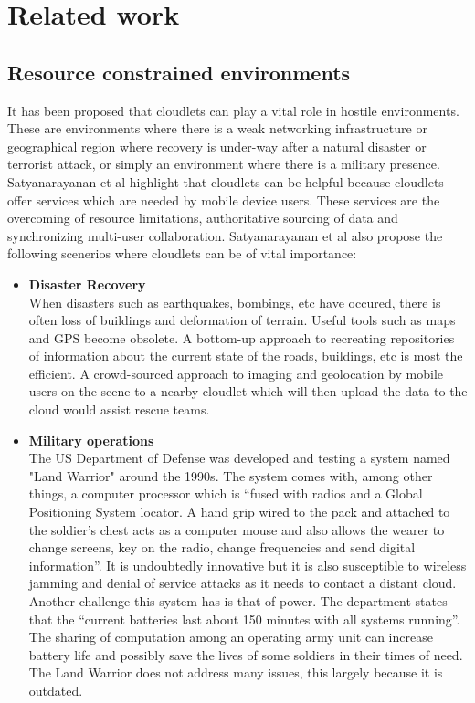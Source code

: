 \section{Related work}

\subsection{Resource constrained environments}
It has been proposed that cloudlets can play a vital role in hostile environments\cite{RefWorks:107}. These are environments
where there is a weak networking infrastructure or geographical region where recovery is under-way after a natural disaster or terrorist attack, or simply an environment where there is a military presence. Satyanarayanan et al\cite{RefWorks:107} highlight that cloudlets can be helpful because cloudlets offer services which are needed by mobile device users. These
services are the overcoming of resource limitations, authoritative sourcing of data and synchronizing multi-user collaboration. Satyanarayanan et al\cite{RefWorks:107} also propose the following scenerios where cloudlets can be of vital importance:

\begin{itemize}

\item \textbf{Disaster Recovery} \\ When disasters such as earthquakes, bombings, etc have occured, there is often loss of buildings and deformation of terrain. Useful tools such as maps and GPS become obsolete. A bottom-up approach to recreating repositories of information about the current state of the roads, buildings, etc is most the efficient. A crowd-sourced approach to imaging and geolocation by mobile users on the scene to a nearby cloudlet which will then upload the data to the cloud would assist rescue teams.

\item \textbf{Military operations} \\ The US Department of Defense was developed and testing a system named "Land Warrior" around the 1990s\cite{usdefense}. The system comes with, among other things, a computer processor which is ``fused with radios and a Global Positioning System locator. A hand grip wired to the pack and attached to the soldier's chest acts as a computer mouse and also allows the wearer to change screens, key on the radio, change frequencies and send digital information''. It is undoubtedly innovative but it is also susceptible to
wireless jamming and denial of service attacks as it needs to contact a distant cloud. Another challenge this system has is that of power. The department states that the ``current batteries last about 150 minutes with all systems running''. The sharing of computation among an operating army unit can increase battery life and possibly save the lives of some soldiers in their times of need. The Land Warrior does not address many issues, this largely because it is outdated.
\end{itemize}

